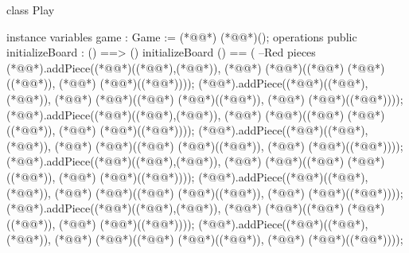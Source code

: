 \begin{vdm_al}
class Play
 
 instance variables
  game : Game := (*@@*) (*@@*)();
 operations
  public initializeBoard : () ==> ()
   initializeBoard () ==
   (
    --Red pieces
    (*@@*).addPiece((*@@*)((*@@*),(*@@*)), (*@@*) (*@@*)((*@@*) (*@@*)((*@@*)), (*@@*) (*@@*)((*@@*))));
    (*@@*).addPiece((*@@*)((*@@*),(*@@*)), (*@@*) (*@@*)((*@@*) (*@@*)((*@@*)), (*@@*) (*@@*)((*@@*))));
    (*@@*).addPiece((*@@*)((*@@*),(*@@*)), (*@@*) (*@@*)((*@@*) (*@@*)((*@@*)), (*@@*) (*@@*)((*@@*))));
    (*@@*).addPiece((*@@*)((*@@*),(*@@*)), (*@@*) (*@@*)((*@@*) (*@@*)((*@@*)), (*@@*) (*@@*)((*@@*))));
    (*@@*).addPiece((*@@*)((*@@*),(*@@*)), (*@@*) (*@@*)((*@@*) (*@@*)((*@@*)), (*@@*) (*@@*)((*@@*))));
    (*@@*).addPiece((*@@*)((*@@*),(*@@*)), (*@@*) (*@@*)((*@@*) (*@@*)((*@@*)), (*@@*) (*@@*)((*@@*))));
    (*@@*).addPiece((*@@*)((*@@*),(*@@*)), (*@@*) (*@@*)((*@@*) (*@@*)((*@@*)), (*@@*) (*@@*)((*@@*))));
    (*@@*).addPiece((*@@*)((*@@*),(*@@*)), (*@@*) (*@@*)((*@@*) (*@@*)((*@@*)), (*@@*) (*@@*)((*@@*))));

\end{vdm_al}
